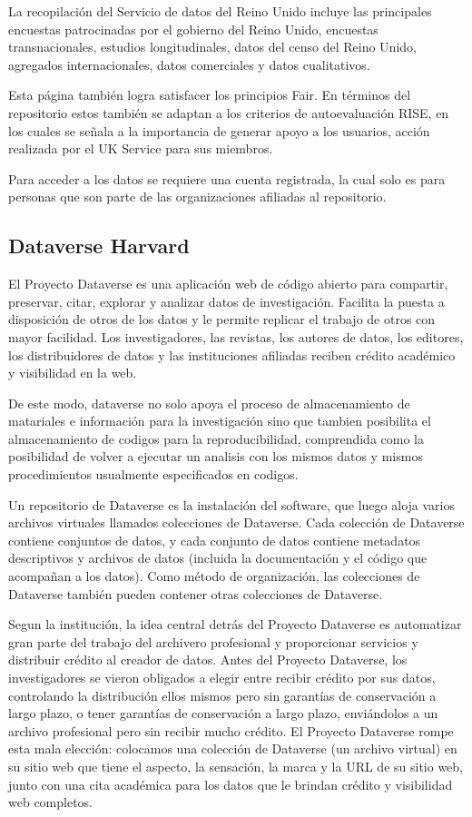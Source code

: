\documentclass[
  14pt,
]{book}
\begin{document}
La recopilación del Servicio de datos del Reino Unido incluye las principales encuestas patrocinadas por el gobierno del Reino Unido, encuestas transnacionales, estudios longitudinales, datos del censo del Reino Unido, agregados internacionales, datos comerciales y datos cualitativos.

Esta página también logra satisfacer los principios Fair. En términos del repositorio estos también se adaptan a los criterios de autoevaluación RISE, en los cuales se señala a la importancia de generar apoyo a los usuarios, acción realizada por el UK Service para sus miembros.

Para acceder a los datos se requiere una cuenta registrada, la cual solo es para personas que son parte de las organizaciones afiliadas al repositorio.

\hypertarget{dataverse-harvard}{%
\subsection{Dataverse Harvard}\label{dataverse-harvard}}

El Proyecto Dataverse es una aplicación web de código abierto para compartir, preservar, citar, explorar y analizar datos de investigación. Facilita la puesta a disposición de otros de los datos y le permite replicar el trabajo de otros con mayor facilidad. Los investigadores, las revistas, los autores de datos, los editores, los distribuidores de datos y las instituciones afiliadas reciben crédito académico y visibilidad en la web.

De este modo, dataverse no solo apoya el proceso de almacenamiento de matariales e información para la investigación sino que tambien posibilita el almacenamiento de codigos para la reproducibilidad, comprendida como la posibilidad de volver a ejecutar un analisis con los mismos datos y mismos procedimientos usualmente especificados en codigos.

Un repositorio de Dataverse es la instalación del software, que luego aloja varios archivos virtuales llamados colecciones de Dataverse. Cada colección de Dataverse contiene conjuntos de datos, y cada conjunto de datos contiene metadatos descriptivos y archivos de datos (incluida la documentación y el código que acompañan a los datos). Como método de organización, las colecciones de Dataverse también pueden contener otras colecciones de Dataverse.

Segun la institución, la idea central detrás del Proyecto Dataverse es automatizar gran parte del trabajo del archivero profesional y proporcionar servicios y distribuir crédito al creador de datos. Antes del Proyecto Dataverse, los investigadores se vieron obligados a elegir entre recibir crédito por sus datos, controlando la distribución ellos mismos pero sin garantías de conservación a largo plazo, o tener garantías de conservación a largo plazo, enviándolos a un archivo profesional pero sin recibir mucho crédito. El Proyecto Dataverse rompe esta mala elección: colocamos una colección de Dataverse (un archivo virtual) en su sitio web que tiene el aspecto, la sensación, la marca y la URL de su sitio web, junto con una cita académica para los datos que le brindan crédito y visibilidad web completos.
\end{document}
